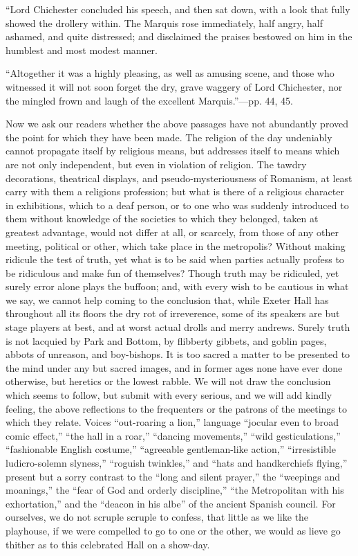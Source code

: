``Lord
Chichester concluded his speech, and then sat down, with a look that
fully showed the drollery within. The Marquis rose immediately, half
angry, half ashamed, and quite distressed; and disclaimed the praises
bestowed on him in the humblest and most modest manner.

``Altogether
it was a highly pleasing, as well as amusing scene, and those who
witnessed it will not soon forget the dry, grave waggery of Lord
Chichester, nor the mingled frown and laugh of the excellent Marquis.''—pp.
44, 45.

Now we ask our
readers whether the above passages have not abundantly proved the point
for which they have been made. The religion of the day undeniably cannot
propagate itself by religious means, but addresses itself to means which
are not only independent, but even in violation of religion. The tawdry
decorations, theatrical displays, and pseudo-mysteriousness of Romanism,
at least carry with them a religions profession; but what is there of a
religious character in exhibitions, which to a deaf person, or to one
who was suddenly introduced to them without knowledge of the societies
to which they belonged, taken at greatest advantage, would not differ at
all, or scarcely, from those of any other meeting, political or other,
which take place in the metropolis? Without making ridicule the test of
truth, yet what is to be said when parties actually profess to be
ridiculous and make fun of themselves? Though truth may be ridiculed,
yet surely error alone plays the buffoon; and, with every wish to be
cautious in what we say, we cannot help coming to the conclusion that,
while Exeter Hall has throughout all its floors the dry rot of
irreverence, some of its speakers are but stage players at best, and at
worst actual drolls and merry andrews. Surely truth is not lacquied by
Park and Bottom, by flibberty gibbets, and goblin pages, abbots of
unreason, and boy-bishops. It is too sacred a matter to be presented to
the mind under any but sacred images, and in former ages none have ever
done otherwise, but heretics or the lowest rabble. We will not draw the
conclusion which seems to follow, but submit with every serious, and we
will add kindly feeling, the above reflections to the frequenters or the
patrons of the meetings to which they relate. Voices ``out-roaring a
lion,'' language ``jocular even to broad comic effect,'' ``the hall in a
roar,'' ``dancing movements,'' ``wild gesticulations,'' ``fashionable English
costume,'' ``agreeable gentleman-like action,'' ``irresistible ludicro-solemn
slyness,'' ``roguish twinkles,'' and ``hats and handkerchiefs flying,''
present but a sorry contrast to the ``long and silent prayer,'' the ``weepings
and moanings,'' the ``fear of God and orderly discipline,'' ``the
Metropolitan with his exhortation,'' and the ``deacon in his albe'' of the
ancient Spanish council. For ourselves, we do not scruple scruple to
confess, that little as we like the playhouse, if we were compelled to
go to one or the other, we would as lieve go thither as to this
celebrated Hall on a show-day.

